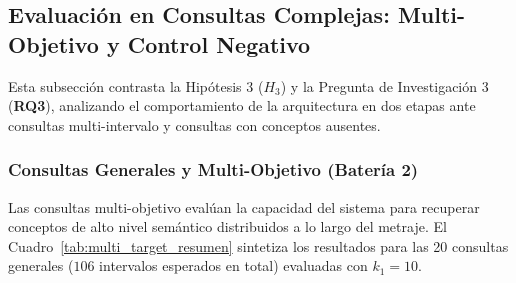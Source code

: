 \subsection{Evaluación en Consultas Complejas: Multi-Objetivo y Control Negativo}
\label{subsec:consultas_complejas}

Esta subsección contrasta la Hipótesis 3 ($H_3$) y la Pregunta de Investigación 3 (\textbf{RQ3}), analizando el comportamiento de la arquitectura en dos etapas ante consultas multi-intervalo y consultas con conceptos ausentes.

\subsubsection{Consultas Generales y Multi-Objetivo (Batería 2)}
Las consultas multi-objetivo evalúan la capacidad del sistema para recuperar conceptos de alto nivel semántico distribuidos a lo largo del metraje. El Cuadro~\ref{tab:multi_target_resumen} sintetiza los resultados para las 20 consultas generales ($106$ intervalos esperados en total) evaluadas con $k_1 = 10$.

